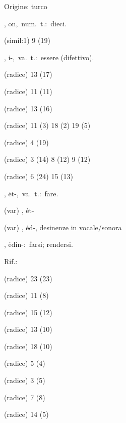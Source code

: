 \begin{glossario}{Origine: turco}
\begin{subvocedue}
\end{subvocedue}
\item[{\color{colorlowref}\spzrl{.Qn}},] {\sf on},\ num.\ t.:\ dieci.
\begin{subvocedue}
\item[(simil:1)]   9 (19)
\end{subvocedue}
\item[{\color{colorlowref}\spzrl{.JB}},] {\sf i-},\ va.\ t.:\ essere (difettivo).
\begin{subvocedue}
\item[(radice)]   13 (17)
\item[(radice)]   11 (11)
\item[(radice)]   13 (16)
\item[(radice)]   11 (3) 18 (2) 19 (5)
\item[(radice)]   4 (19)
\item[(radice)]   3 (14) 8 (12) 9 (12)
\item[(radice)]   6 (24) 15 (13)
\end{subvocedue}
\item[{\color{colorlowref}\spzrl{:EtB}},] {\sf ėt-},\ va.\ t.:\ fare.
\begin{subvocedue}
\item[(var)] , {\sf ėt-}\item[(var)] , {\sf ėd-}, desinenze in vocale/sonora\item[\subglossariobullet] , {\sf ėdin-}:\ farsi; rendersi.
\begin{subvocedue}
\item[Rif.:] 
\end{subvocedue}
\item[(radice)]   23 (23)
\item[(radice)]   11 (8)
\item[(radice)]   15 (12)
\item[(radice)]   13 (10)
\item[(radice)]   18 (10)
\item[(radice)]   5 (4)
\item[(radice)]   3 (5)
\item[(radice)]   7 (8)
\item[(radice)]   14 (5)

\end{subvocedue}
\end{glossario}
